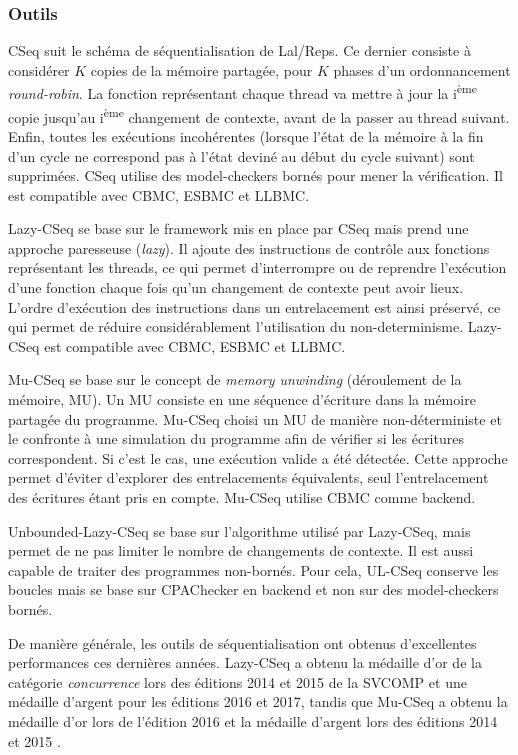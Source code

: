 \subsubsection{Outils}

CSeq\cite{CSeq} suit le schéma de séquentialisation de Lal/Reps. Ce dernier
consiste à considérer \(K\) copies de la mémoire partagée, pour \(K\) phases
d'un ordonnancement \emph{round-robin}. La fonction représentant chaque thread
va mettre à jour la i\textsuperscript{ème} copie jusqu'au i\textsuperscript{ème}
changement de contexte, avant de la passer au thread suivant. Enfin, toutes les
exécutions incohérentes (lorsque l'état de la mémoire à la fin d'un cycle ne
correspond pas à l'état deviné au début du cycle suivant) sont supprimées. CSeq
utilise des model-checkers bornés pour mener la vérification. Il est compatible
avec CBMC, ESBMC et LLBMC.

Lazy-CSeq\cite{LazyCSeq} se base sur le framework mis en place par CSeq mais
prend une approche paresseuse (\emph{lazy}). Il ajoute des instructions de
contrôle aux fonctions représentant les threads, ce qui permet d'interrompre ou
de reprendre l'exécution d'une fonction chaque fois qu'un changement de contexte
peut avoir lieux. L'ordre d'exécution des instructions dans un entrelacement est
ainsi préservé, ce qui permet de réduire considérablement l'utilisation du
non-determinisme. Lazy-CSeq est compatible avec CBMC, ESBMC et LLBMC.

Mu-CSeq\cite{MuCSeq} se base sur le concept de \emph{memory
unwinding} (déroulement de la mémoire, MU). Un MU consiste en une
séquence d'écriture dans la mémoire partagée du programme. Mu-CSeq
choisi un MU de manière non-déterministe et le confronte à une
simulation du programme afin de vérifier si les écritures correspondent.
Si c'est le cas, une exécution valide a été détectée. Cette approche
permet d'éviter d'explorer des entrelacements équivalents, seul l'entrelacement
des écritures étant pris en compte. Mu-CSeq utilise CBMC comme backend.

Unbounded-Lazy-CSeq\cite{ULCSeq} se base sur l'algorithme utilisé
par Lazy-CSeq, mais permet de ne pas limiter le nombre de changements de
contexte. Il est aussi capable de traiter des programmes non-bornés.
Pour cela, UL-CSeq conserve les boucles mais se base sur
CPAChecker\cite{CPAChecker} en backend et non sur des model-checkers bornés.

De manière générale, les outils de séquentialisation ont obtenus
d'excellentes performances ces dernières années. Lazy-CSeq a obtenu la
médaille d'or de la catégorie \emph{concurrence} lors des éditions 2014
et 2015 de la SVCOMP et une médaille d'argent pour les éditions 2016 et
2017, tandis que Mu-CSeq a obtenu la médaille d'or lors de l'édition
2016 et la médaille d'argent lors des éditions 2014 et 2015
\cite{svcomp_2016_result, svcomp_2015_result,
svcomp_2014_result, svcomp_2017_result}.

